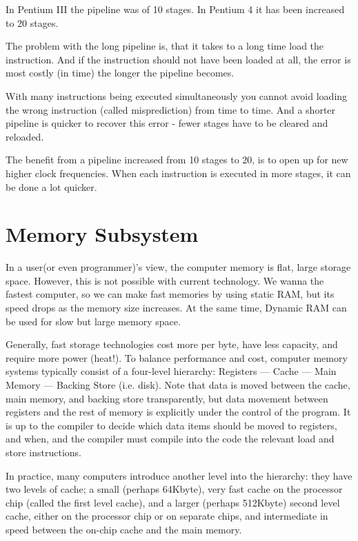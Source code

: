 \documentclass[doc,natbib,12pt]{apa6}
\begin{document}
	In Pentium III the pipeline was of 10 stages. In Pentium 4 it has been increased to 20 stages.
	
	The problem with the long pipeline is, that it takes to a long time load the instruction. And if the instruction should not have been loaded at all, the error is most costly (in time) the longer the pipeline becomes. \citep{Karbosguide}
	
	With many instructions being executed simultaneously you cannot avoid loading the wrong instruction (called misprediction) from time to time. And a shorter pipeline is quicker to recover this error - fewer stages have to be cleared and reloaded. \citep{Karbosguide}
	
	The benefit from a pipeline increased from 10 stages to 20, is to open up for new higher clock frequencies. When each instruction is executed in more stages, it can be done a lot quicker. \citep{Karbosguide}
	
	
	\newpage
	\section{Memory Subsystem} \label{chp:memorySubsystem}
	
	In a user(or even programmer)'s view, the computer memory is flat, large storage space. However, this is not possible with current technology. We wanna the fastest computer, so we can make fast memories by using static RAM, but its speed drops as the memory size increases. At the same time, Dynamic RAM can be used for slow but large memory space. 
	
	Generally, fast storage technologies cost more per byte, have less capacity, and require more power (heat!). To balance performance and cost, computer memory systems typically consist of a four-level hierarchy: Registers — Cache — Main Memory — Backing Store (i.e. disk). Note that data is moved between the cache, main memory, and backing store transparently, but data movement between registers and the rest of memory is explicitly under the control of the program. It is up to the compiler to decide which data items should be moved to registers, and when, and the compiler must compile into the code the relevant load and store instructions. \citep{Stevens2009}
	
	In practice, many computers introduce another level into the hierarchy: they have two levels of cache; a small (perhaps 64Kbyte), very fast cache on the processor chip (called the first level cache), and a larger (perhaps 512Kbyte) second level cache, either on the processor chip or on separate chips, and intermediate in speed between the on-chip cache and the main memory. \citep{Stevens2009}
	
\end{document}
